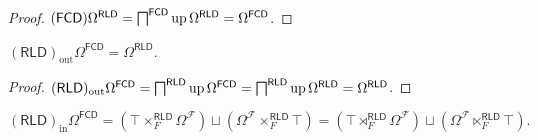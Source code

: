 \begin{proof}
  $(\mathsf{FCD}) \Omega^{\mathsf{RLD}} =
  \bigsqcap^{\mathsf{FCD}} \operatorname{up} \Omega^{\mathsf{RLD}} =
  \Omega^{\mathsf{FCD}}$.
\end{proof}

\begin{prop}
  $(\mathsf{RLD})_{\operatorname{out}} \Omega^{\mathsf{FCD}} =
  \Omega^{\mathsf{RLD}}$.
\end{prop}

\begin{proof}
  $(\mathsf{RLD})_{\operatorname{out}} \Omega^{\mathsf{FCD}} =
  \bigsqcap^{\mathsf{RLD}} \operatorname{up} \Omega^{\mathsf{FCD}} =
  \bigsqcap^{\mathsf{RLD}} \operatorname{up} \Omega^{\mathsf{RLD}} =
  \Omega^{\mathsf{RLD}}$.
\end{proof}

\begin{prop}
  \[ (\mathsf{RLD})_{\operatorname{in}} \Omega^{\mathsf{FCD}} = \left(
  \top \times^{\mathsf{RLD}}_F \Omega^{\mathscr{F}} \right) \sqcup
  \left( \Omega^{\mathscr{F}} \times^{\mathsf{RLD}}_F \top \right) =
  \left(
  \top \rtimes^{\mathsf{RLD}}_F \Omega^{\mathscr{F}} \right) \sqcup
  \left( \Omega^{\mathscr{F}} \ltimes^{\mathsf{RLD}}_F \top \right). \]
\end{prop}

